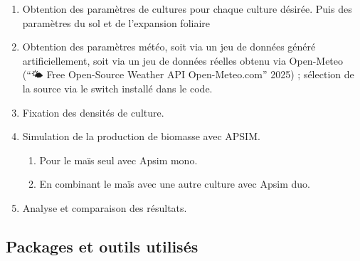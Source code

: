 \documentclass[
]{article}
\begin{document}
\begin{enumerate}
\def\labelenumi{\arabic{enumi}.}
\item
  Obtention des paramètres de cultures pour chaque culture désirée. Puis
  des paramètres du sol et de l'expansion foliaire
\item
  Obtention des paramètres météo, soit via un jeu de données généré
  artificiellement, soit via un jeu de données réelles obtenu via
  Open-Meteo ({``🌤️ {Free} {Open}-{Source} {Weather} {API} {\textbar}
  {Open}-{Meteo}.com''} 2025) ; sélection de la source via le switch
  installé dans le code.
\item
  Fixation des densités de culture.
\item
  Simulation de la production de biomasse avec APSIM.

  \begin{enumerate}
  \def\labelenumii{\arabic{enumii}.}
  \item
    Pour le maïs seul avec Apsim mono.
  \item
    En combinant le maïs avec une autre culture avec Apsim duo.
  \end{enumerate}
\item
  Analyse et comparaison des résultats.
\end{enumerate}

\subsection{Packages et outils
utilisés}\label{packages-et-outils-utilisuxe9s}
\end{document}
